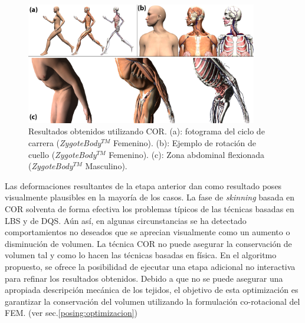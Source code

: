 \begin{figure}%
   \centering
   \includegraphics[width=0.90\textwidth]{IMG/examples}
    \caption{Resultados obtenidos utilizando \ac{COR}. (a): fotograma del ciclo de carrera (\emph{ZygoteBody}$^{TM}$ Femenino). (b): Ejemplo de rotación de cuello (\emph{ZygoteBody}$^{TM}$ Femenino). (c): Zona abdominal flexionada (\emph{ZygoteBody}$^{TM}$ Masculino).}
    \label{fig:run1}
\end{figure}
\clearpage


Las deformaciones resultantes de la etapa anterior dan como resultado poses visualmente plausibles en la mayoría de los casos. 
La fase de \emph{skinning} basada en \ac{COR} solventa de forma efectiva los problemas típicos de las técnicas basadas en \ac{LBS} y de \ac{DQS}. Aún así, en algunas circunstancias se ha detectado comportamientos no deseados que se aprecian visualmente como un aumento o disminución de volumen. 
La técnica \ac{COR} no puede asegurar la conservación de volumen tal y como lo hacen las técnicas basadas en física. %
En el algoritmo propuesto, se ofrece la posibilidad de ejecutar una etapa adicional no interactiva para refinar los resultados obtenidos.
Debido a que no se puede asegurar una apropiada descripción mecánica de los tejidos, el objetivo de esta optimización es garantizar la conservación del volumen utilizando la formulación co-rotacional del \acs{FEM}. (ver sec.\ref{posing:optimizacion})

